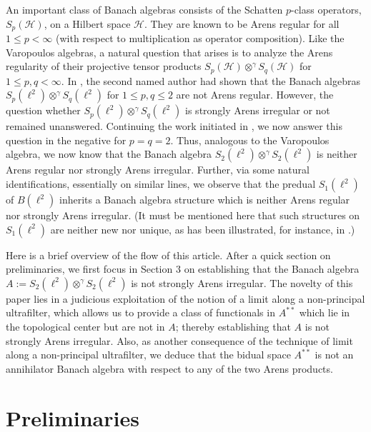 \documentclass[a4]{amsart}
\theoremstyle{cupthm}
\theoremstyle{cupdefn}
\theoremstyle{cuprem}
\numberwithin{equation}{section}
\newcommand{\obp}{\otimes^{\gamma}}
\newcommand{\mH}{\mathcal{H}}
\begin{document}
An important class of Banach algebras consists of the Schatten
$p$-class operators, $S_p(\mH)$, on a Hilbert space $\mH$. They are
known to be Arens regular for all $1 \leq p < \infty$ (with respect to
multiplication as operator composition). Like the Varopoulos algebras,
a natural question that arises is to analyze the Arens regularity of
their projective tensor products $S_p(\mH) \obp S_q(\mH)$ for $1 \leq
p, q < \infty$. In \cite{Lav}, the second named author had shown that
the Banach algebras $S_p(\ell^2) \obp S_q(\ell^2)$ for $1 \leq p, q
\leq 2$ are not Arens regular. However, the question whether
$S_p(\ell^2) \obp S_q(\ell^2)$ is strongly Arens irregular or not
remained unanswered. Continuing the work initiated in \cite{Lav}, we
now answer this question in the negative for $p = q=2$. Thus,
analogous to the Varopoulos algebra, we now know that the Banach
algebra $S_2(\ell^2) \obp S_2(\ell^2)$ is neither Arens regular nor
strongly Arens irregular. Further, via some natural identifications,
essentially on similar lines, we observe that the predual
$S_1(\ell^2)$ of $B(\ell^2)$ inherits a Banach algebra structure which
is neither Arens regular nor strongly Arens irregular. (It must be
mentioned here that such structures on $S_1(\ell^2)$ are neither new
nor unique, as has been illustrated, for instance, in .)


Here is a brief overview of the flow of this article. After a quick
section on preliminaries, we first focus in Section $3$ on
establishing that the Banach algebra $A:=S_2(\ell^2)\obp S_2(\ell^2)$
is not strongly Arens irregular. The novelty of this paper lies in a
judicious exploitation of the notion of a limit along a non-principal
ultrafilter, which allows us to provide a class of functionals in
$A^{**}$ which lie in the topological center but are not in $A$;
thereby establishing that $A$ is not strongly Arens irregular. Also,
as another consequence of the technique of limit along a non-principal
ultrafilter, we deduce that the bidual space $A^{**}$ is not an
annihilator Banach algebra with respect to any of the two Arens
products.


\section{Preliminaries}
\end{document}
